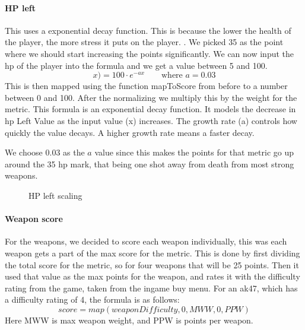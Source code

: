 \paragraph{HP left}

This uses a exponential decay function. This is because the lower the health of the player, the more stress it puts on the player. . We picked 35 as the point where we should start increasing the points significantly. We can now input the \acrshort{hp} of the player into the formula and we get a value between 5 and 100.            
$$x) = 100 \cdot e^{-ax}  \qquad \text{where } a = 0.03$$
This is then mapped using the function mapToScore from before to a number between 0 and 100. After the normalizing we multiply this by the weight for the metric. 
This formula is an exponential decay function. It models the decrease in \acrshort{hp} Left Value as the input value (x) increases. The growth rate (a) controls how quickly the value decays. A higher growth rate means a faster decay. 

We choose 0.03 as the $a$ value since this makes the points for that metric go up around the 35 \acrshort{hp} mark, that being one shot away from death from most strong weapons.


\begin{figure}
    \centering
    \caption{HP left scaling}
    \label{fig:hp-left}
\end{figure}

\paragraph{Weapon score}
For the weapons, we decided to score each weapon individually, this was each weapon gets a part of the max score for the metric. This is done by first dividing the total score for the metric, so for four weapons that will be 25 points. Then it used that value as the max points for the weapon, and rates it with the difficulty rating from the game, taken from the ingame buy menu. For an ak47, which has a difficulty rating of 4, the formula is as follows: $$ score = map(weaponDifficulty, 0, MWW, 0, PPW) $$ Here MWW is max weapon weight, and PPW is points per weapon.

